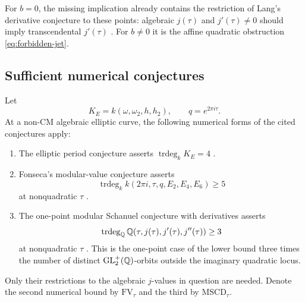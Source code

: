 For $b=0$, the missing implication already contains the restriction
of Lang's derivative conjecture to these points: algebraic $j(\tau)$
and $j'(\tau)\ne0$ should imply transcendental $j'(\tau)$
\cite[p.~167, Conjecture~34]{WaldschmidtSurvey}.  For $b\ne0$ it is
the affine quadratic obstruction \eqref{eq:forbidden-jet}.

\subsection{Sufficient numerical conjectures}
\label{subsec:precise-period-hierarchy}
Let
\[
 K_E=k(\omega,\omega_2,h,h_2),\qquad q=e^{2\pi i\tau}.
\]
At a non-CM algebraic elliptic curve, the following numerical forms of
the cited conjectures apply:
\begin{enumerate}
\item The elliptic period conjecture asserts
$\operatorname{trdeg}_k K_E=4$
\cite[Conjecture~4.5]{Fonseca}.
\item Fonseca's modular-value conjecture asserts
\[
 \operatorname{trdeg}_k
 k(2\pi i,\tau,q,E_2,E_4,E_6)\ge5
\]
at nonquadratic $\tau$ \cite[Conjecture~4.8]{Fonseca}.
\item The one-point modular Schanuel conjecture with derivatives asserts
\[
 \operatorname{trdeg}_{\mathbb Q}
 \mathbb Q(\tau,j(\tau),j'(\tau),j''(\tau))\ge3
\]
at nonquadratic $\tau$
\cite[Conjecture~2.3]{EterovicMSCD}.  This is the one-point case of the
lower bound three times the number of distinct
$\operatorname{GL}_2^+(\mathbb Q)$-orbits outside the imaginary quadratic locus.
\end{enumerate}
Only their restrictions to the algebraic $j$-values in question are needed.
Denote the second numerical bound by $\mathrm{FV}_\tau$ and the third
by $\mathrm{MSCD}_\tau$.


